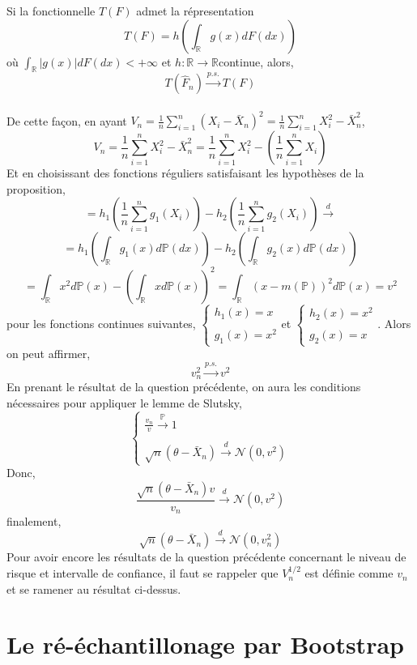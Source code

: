 \documentclass{article}
\newcommand{\R}{\mathbb{R}}
\begin{document}
Si la fonctionnelle $\displaystyle T(F)$ admet la répresentation
$$T(F)=h\left(\int_{\R}g(x)dF(dx)\right)$$
où $\displaystyle \int_{\R}|g(x)|dF(dx)<+\infty$ et $\displaystyle h: \R\rightarrow\R$continue, alors,
$$ T(\hat F_n)\overset{p.s.}{\longrightarrow}T(F)$$
\\
De cette façon, en ayant $\displaystyle V_n=\frac{1}{n}\sum_{i=1}^n(X_i -\bar X_ n)^2=\frac{1}{n}\sum_{i=1}^nX_i^2-\bar X_n^2$,
$$V_n=\frac{1}{n}\sum_{i=1}^nX_i^2-\bar X_n^2=\frac{1}{n}\sum_{i=1}^nX_i^2-\left(\frac{1}{n}\sum_{i=1}^nX_i\right)$$
Et en choisissant des fonctions réguliers satisfaisant les hypothèses de la proposition,
$$=h_{1}\left(\frac{1}{n}\sum_{i=1}^n g_{1}(X_i)\right)-h_{2}\left(\frac{1}{n}\sum_{i=1}^n g_{2}(X_i)\right)\overset{d}{\longrightarrow}$$
$$=h_1\left(\int_{\R}g_1(x)d\mathbb{P}(dx)\right)-h_2\left(\int_{\R}g_2(x)d\mathbb{P}(dx)\right)$$
$$=\int_{\R}x^2d\mathbb{P}(x)-\left({\int_{\R}xd\mathbb{P}(x)}\right)^2=\int_{\R}(x-m(\mathbb{P}))^2d\mathbb{P}(x)=v^2$$
pour les fonctions continues suivantes,
$ \left\{
\begin{array}{ll}
\displaystyle h_1(x)=x \\ \\
\displaystyle g_1(x)=x^2
\end{array}
\right.
$et
$ \left\{
\begin{array}{ll}
\displaystyle h_2(x)=x^2 \\ \\
\displaystyle g_2(x)=x
\end{array}
\right.
$.
Alors on peut affirmer,
$$v_{n}^2\overset{p.s.}{\longrightarrow}v^2$$
En prenant le résultat de la question précédente, on aura les conditions nécessaires pour appliquer le lemme de Slutsky,
$$ \left\{
\begin{array}{ll}
\displaystyle \frac{v_{n}}{v}\overset{\mathbb{P}}{\longrightarrow} 1\\ \\
\displaystyle \sqrt{n}(\theta-\bar X_{n})\overset{d}{\longrightarrow}\mathcal{N}(0,v^2)
\end{array}
\right.
$$
Donc,
$$\frac{\sqrt{n}(\theta-\bar X_{n})v}{v_{n}}\overset{d}{\longrightarrow}\mathcal{N}(0,v^2)$$
finalement,
$$ \sqrt{n}(\theta-\bar X_{n})\overset{d}{\longrightarrow}\mathcal{N}(0,v_{n}^{2})$$
Pour avoir encore les résultats de la question précédente concernant le niveau de risque et intervalle de confiance, il faut se rappeler que $\displaystyle V_{n}^{1/2}$ est définie comme $\displaystyle v_{n}$ et se ramener au résultat ci-dessus.
\section{Le ré-échantillonage par Bootstrap}
\end{document}
